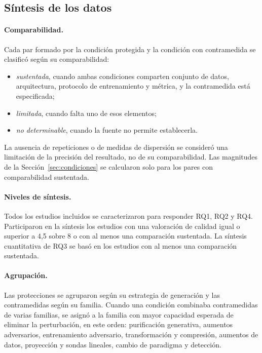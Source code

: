 

\subsection{Síntesis de los datos}\label{sec:sintesis}

\paragraph{Comparabilidad.} Cada par formado por la condición protegida y la condición con contramedida se clasificó según su comparabilidad:
\begin{itemize}
\item \emph{sustentada}, cuando ambas condiciones comparten conjunto de datos, arquitectura, protocolo de entrenamiento y métrica, y la contramedida está especificada;
\item \emph{limitada}, cuando falta uno de esos elementos;
\item \emph{no determinable}, cuando la fuente no permite establecerla.
\end{itemize}
La ausencia de repeticiones o de medidas de dispersión se consideró una limitación de la precisión del resultado, no de su comparabilidad. Las magnitudes de la Sección~\ref{sec:condiciones} se calcularon solo para los pares con comparabilidad sustentada.

\paragraph{Niveles de síntesis.} Todos los estudios incluidos se caracterizaron para responder RQ1, RQ2 y RQ4. Participaron en la síntesis los estudios con una valoración de calidad igual o superior a 4,5 sobre 8 o con al menos una comparación sustentada. La síntesis cuantitativa de RQ3 se basó en los estudios con al menos una comparación sustentada.

\paragraph{Agrupación.} Las protecciones se agruparon según su estrategia de generación y las contramedidas según su familia. Cuando una condición combinaba contramedidas de varias familias, se asignó a la familia con mayor capacidad esperada de eliminar la perturbación, en este orden: purificación generativa, aumentos adversarios, entrenamiento adversario, transformación y compresión, aumentos de datos, proyección y sondas lineales, cambio de paradigma y detección.

